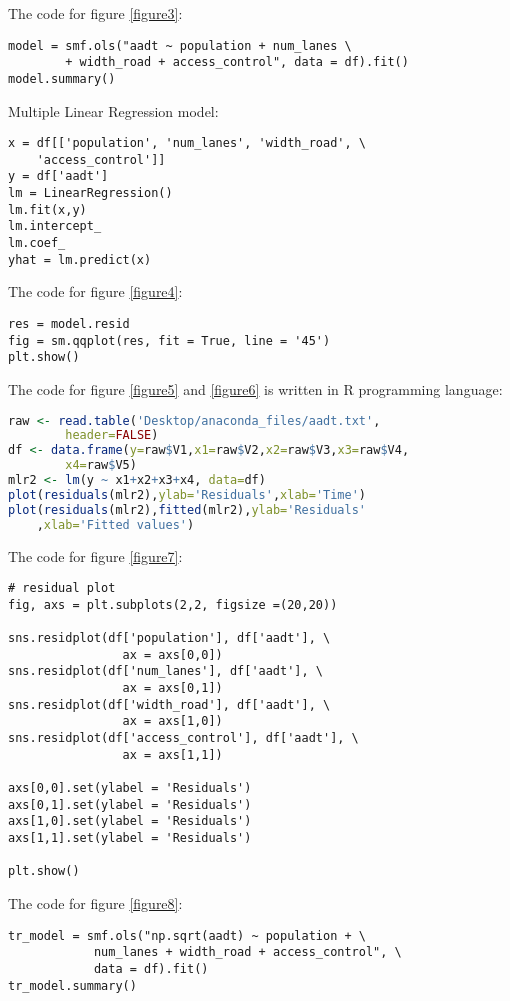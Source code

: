 \documentclass[english]{article}
\begin{document}
The code for figure \ref{figure3}: 
\begin{lstlisting}[frame=trBL]
model = smf.ols("aadt ~ population + num_lanes \ 
        + width_road + access_control", data = df).fit()
model.summary()
\end{lstlisting}

Multiple Linear Regression model:
\begin{lstlisting}[frame=trBL]
x = df[['population', 'num_lanes', 'width_road', \ 
    'access_control']]
y = df['aadt']
lm = LinearRegression()
lm.fit(x,y)
lm.intercept_
lm.coef_
yhat = lm.predict(x)
\end{lstlisting}

The code for figure \ref{figure4}:
\begin{lstlisting}[frame=trBL]
res = model.resid
fig = sm.qqplot(res, fit = True, line = '45')
plt.show()
\end{lstlisting}

The code for figure \ref{figure5} and \ref{figure6} is written in R programming language:
\begin{lstlisting}[frame=trBL, language = R]
raw <- read.table('Desktop/anaconda_files/aadt.txt',
        header=FALSE)
df <- data.frame(y=raw$V1,x1=raw$V2,x2=raw$V3,x3=raw$V4, 
        x4=raw$V5)
mlr2 <- lm(y ~ x1+x2+x3+x4, data=df)
plot(residuals(mlr2),ylab='Residuals',xlab='Time')
plot(residuals(mlr2),fitted(mlr2),ylab='Residuals'
    ,xlab='Fitted values')
\end{lstlisting}

The code for figure \ref{figure7}:
\begin{lstlisting}[frame=trBL]
# residual plot
fig, axs = plt.subplots(2,2, figsize =(20,20))

sns.residplot(df['population'], df['aadt'], \ 
                ax = axs[0,0])
sns.residplot(df['num_lanes'], df['aadt'], \ 
                ax = axs[0,1])
sns.residplot(df['width_road'], df['aadt'], \ 
                ax = axs[1,0])
sns.residplot(df['access_control'], df['aadt'], \ 
                ax = axs[1,1])

axs[0,0].set(ylabel = 'Residuals')
axs[0,1].set(ylabel = 'Residuals')
axs[1,0].set(ylabel = 'Residuals')
axs[1,1].set(ylabel = 'Residuals')

plt.show()
\end{lstlisting}

The code for figure \ref{figure8}:
\begin{lstlisting}[frame=trBL]
tr_model = smf.ols("np.sqrt(aadt) ~ population + \ 
            num_lanes + width_road + access_control", \ 
            data = df).fit()
tr_model.summary()
\end{lstlisting}
\end{document}
